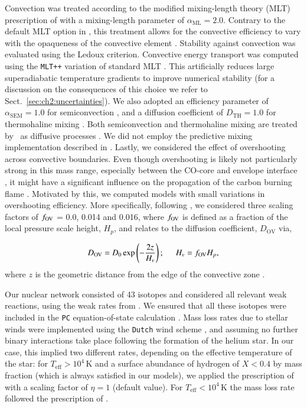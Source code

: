 \documentclass[main.tex]{subfiles}
\begin{document}
Convection was treated according to the modified mixing-length theory (MLT) prescription of \cite{MLT_Henyey} with a mixing-length parameter of $\alpha_{\text{ML}} = 2.0$. Contrary to the default MLT option in \mesa, this treatment allows for the convective efficiency to vary with the opaqueness of the convective element \citep{Paxton:2010ji}. 
Stability against convection was evaluated using the Ledoux criterion. 
Convective energy transport was computed using the \texttt{MLT++} variation of standard MLT \citep{Paxton:2015jva}. This artificially reduces large  superadiabatic temperature gradients to improve numerical stability (for a discussion on the consequences of this choice we refer to Sect.~\ref{sec:ch2:uncertainties}). 
We also adopted an  efficiency parameter of $\alpha_{\text{SEM}} = 1.0$ for semiconvection \citep{Langer1991}, and a diffusion coefficient of  $D_{\text{TH}} = 1.0$ for thermohaline mixing \citep{Brown_2013}. Both semiconvection and thermohaline mixing are treated by \mesa\ as diffusive processes \citep{kippenhahn1980,Langer1983}. We did not employ the predictive mixing implementation  described in \cite{Paxton:2017eie}. Lastly, we considered the effect of  overshooting across convective boundaries. Even though overshooting is likely not particularly strong  in this mass range, especially between the CO-core and envelope interface \citep{Lecoanet:2016abca}, it might have a significant influence on the propagation of the carbon burning flame \citep{Farmer:2015afs}. Motivated by this, we computed models with small variations in overshooting efficiency. More specifically, following \cite{Jones2013apj}, we considered three scaling factors of $f_{\rm OV}$ = 0.0, 0.014 and 0.016, where $f_{\rm OV}$ is defined  as a fraction of the local pressure scale height, $H_p$, and relates to the diffusion coefficient, $D_{\text{OV}}$ via,


\begin{align}
	\label{eq:OV}
	D_{\text{OV}} = D_0 \exp \left( - \frac{2z}{H_v} \right); \hspace{0.5cm} H_v = f_{\text{OV}} H_p,
\end{align}
where $z$ is the geometric distance from the edge of the convective zone \citep{Herwig2000}. 


Our nuclear network consisted of 43 
isotopes and considered all  relevant weak reactions, using the 
weak rates from \cite{Suzuki2016}. We ensured that all these isotopes 
were  included in the \texttt{PC} equation-of-state calculation \citep[see][for details]{Schwab:2017epw}.
Mass loss rates due to stellar winds were implemented using the \texttt{Dutch} wind scheme \citep{Dutch}, and assuming no further binary interactions take place following the formation of the helium star. In our case, this implied two different rates, depending on the effective temperature of the star: for $T_{\text{eff}} > 10^4$\,K and a surface abundance of hydrogen of $X < 0.4$ by mass fraction (which is always satisfied in our models), we applied the prescription of \cite{Nugis2000} with a scaling factor of $\eta = 1$ (default value). For $T_{\text{eff}} < 10^4$\,K the mass loss rate followed the prescription of \cite{deJager1988}. 
\end{document}
